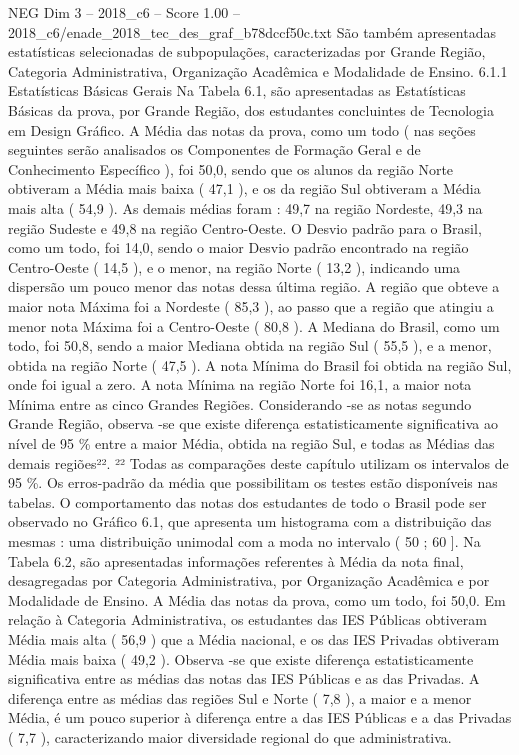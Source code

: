 \begin{textsample}{NEG Dim 3 – 2018\_c6 – Score 1.00 – 2018\_c6/enade\_2018\_tec\_des\_graf\_b78dccf50c.txt}
São também apresentadas estatísticas selecionadas de subpopulações, caracterizadas por Grande Região, Categoria Administrativa, Organização Acadêmica e Modalidade de Ensino. 6.1.1 Estatísticas Básicas Gerais Na Tabela 6.1, são apresentadas as Estatísticas Básicas da prova, por Grande Região, dos estudantes concluintes de Tecnologia em Design Gráfico.
A Média das notas da prova, como um todo ( nas seções seguintes serão analisados os Componentes de Formação Geral e de Conhecimento Específico ), foi 50,0, sendo que os alunos da região Norte obtiveram a Média mais baixa ( 47,1 ), e os da região Sul obtiveram a Média mais alta ( 54,9 ).
As demais médias foram : 49,7 na região Nordeste, 49,3 na região Sudeste e 49,8 na região Centro-Oeste.
O Desvio padrão para o Brasil, como um todo, foi 14,0, sendo o maior Desvio padrão encontrado na região Centro-Oeste ( 14,5 ), e o menor, na região Norte ( 13,2 ), indicando uma dispersão um pouco menor das notas dessa última região.
A região que obteve a maior nota Máxima foi a Nordeste ( 85,3 ), ao passo que a região que atingiu a menor nota Máxima foi a Centro-Oeste ( 80,8 ).
A Mediana do Brasil, como um todo, foi 50,8, sendo a maior Mediana obtida na região Sul ( 55,5 ), e a menor, obtida na região Norte ( 47,5 ).
A nota Mínima do Brasil foi obtida na região Sul, onde foi igual a zero.
A nota Mínima na região Norte foi 16,1, a maior nota Mínima entre as cinco Grandes Regiões.
Considerando -se as notas segundo Grande Região, observa -se que existe diferença estatisticamente significativa ao nível de 95 \% entre a maior Média, obtida na região Sul, e todas as Médias das demais regiões²². ²² Todas as comparações deste capítulo utilizam os intervalos de 95 \%.
Os erros-padrão da média que possibilitam os testes estão disponíveis nas tabelas.
O comportamento das notas dos estudantes de todo o Brasil pode ser observado no Gráfico 6.1, que apresenta um histograma com a distribuição das mesmas : uma distribuição unimodal com a moda no intervalo ( 50 ; 60 ].
Na Tabela 6.2, são apresentadas informações referentes à Média da nota final, desagregadas por Categoria Administrativa, por Organização Acadêmica e por Modalidade de Ensino.
A Média das notas da prova, como um todo, foi 50,0.
Em relação à Categoria Administrativa, os estudantes das IES Públicas obtiveram Média mais alta ( 56,9 ) que a Média nacional, e os das IES Privadas obtiveram Média mais baixa ( 49,2 ).
Observa -se que existe diferença estatisticamente significativa entre as médias das notas das IES Públicas e as das Privadas.
A diferença entre as médias das regiões Sul e Norte ( 7,8 ), a maior e a menor Média, é um pouco superior à diferença entre a das IES Públicas e a das Privadas ( 7,7 ), caracterizando maior diversidade regional do que administrativa.

\end{textsample}
